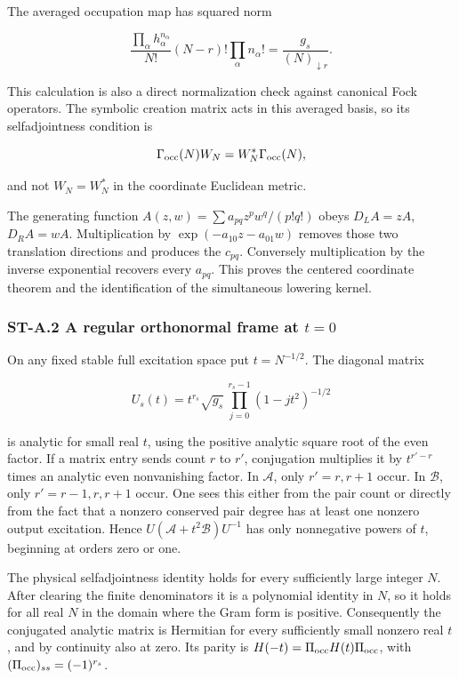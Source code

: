 \documentclass[a4paper,11pt]{article}
\numberwithin{equation}{section}
\begin{document}
The averaged occupation map has squared norm

\[
\frac{\prod_\alpha h_\alpha^{n_\alpha}}{N!}
(N-r)!\prod_\alpha n_\alpha!
=\frac{g_s}{(N)_{\downarrow r}}.
\]

This calculation is also a direct normalization check against canonical Fock operators. The symbolic creation matrix acts in this averaged basis, so its selfadjointness condition is

\[
\Gamma_{\rm occ}(N)W_N=W_N^*\Gamma_{\rm occ}(N),
\]

and not \(W_N=W_N^*\) in the coordinate Euclidean metric.

The generating function \(A(z,w)=\sum a_{pq}z^pw^q/(p!q!)\) obeys \(D_LA=zA\), \(D_RA=wA\). Multiplication by \(\exp(-a_{10}z-a_{01}w)\) removes those two translation directions and produces the \(c_{pq}\). Conversely multiplication by the inverse exponential recovers every \(a_{pq}\). This proves the centered coordinate theorem and the identification of the simultaneous lowering kernel.

\hypertarget{st-a.2-a-regular-orthonormal-frame-at-t0}{%
\subsubsection{\texorpdfstring{ST-A.2 A regular orthonormal frame at \(t=0\)}{ST-A.2 A regular orthonormal frame at t=0}}\label{st-a.2-a-regular-orthonormal-frame-at-t0}}

On any fixed stable full excitation space put \(t=N^{-1/2}\). The diagonal matrix

\[
U_s(t)=t^{r_s}\sqrt{g_s}\,
\prod_{j=0}^{r_s-1}(1-jt^2)^{-1/2}
\]

is analytic for small real \(t\), using the positive analytic square root of the even factor. If a matrix entry sends count \(r\) to \(r'\), conjugation multiplies it by \(t^{r'-r}\) times an analytic even nonvanishing factor. In \(\mathscr A\), only \(r'=r,r+1\) occur. In \(\mathscr B\), only \(r'=r-1,r,r+1\) occur. One sees this either from the pair count or directly from the fact that a nonzero conserved pair degree has at least one nonzero output excitation. Hence \(U(\mathscr A+t^2\mathscr B)U^{-1}\) has only nonnegative powers of \(t\), beginning at orders zero or one.

The physical selfadjointness identity holds for every sufficiently large integer \(N\). After clearing the finite denominators it is a polynomial identity in \(N\), so it holds for all real \(N\) in the domain where the Gram form is positive. Consequently the conjugated analytic matrix is Hermitian for every sufficiently small nonzero real \(t\), and by continuity also at zero. Its parity is \(H(-t)=\Pi_{\rm occ}H(t)\Pi_{\rm occ}\), with \((\Pi_{\rm occ})_{ss}=(-1)^{r_s}\).
\end{document}
